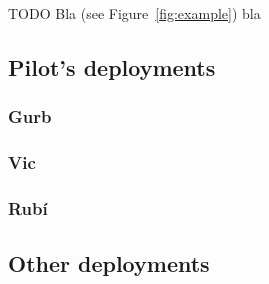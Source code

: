 TODO Bla (see Figure~\ref{fig:example}) bla


\subsection{Pilot's deployments}

\subsubsection{Gurb}

\subsubsection{Vic}

\subsubsection{Rub\'{i}}

\subsection{Other deployments}

